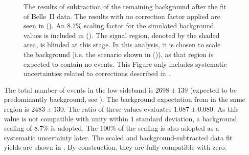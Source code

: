\begin{figure}[hbtp!]
    \centering
    \caption{\label{fig:sidebands_subtracted_figures} The results of subtraction of the remaining \BB background after the fit of Belle~II data.
    The results with no correction factor applied are seen in (). 
    An 8.7\% scaling factor for the simulated background values is included in ().
    The signal region, denoted by the shaded area, is blinded at this stage.
    In this analysis, it is chosen to scale the background (i.e. the scenario shown in ()),
    as that region is expected to contain no \BtoXsgamma events.
    This Figure only includes systematic uncertainties related to corrections described in .
    }
\end{figure}

The total number of events in the low-\EB sideband is $2698\pm139$ (expected to be predominantly background, see ).
The background expectation from \MC in the same region is $2483\pm130$.
The ratio of these values evaluates $1.087\pm0.080$.
As this value is not compatible with unity within $1$ standard deviation, a background scaling of 8.7\% is adopted.
The 100\% of the scaling is also adopted as a systematic uncertainty later.
The scaled and background-subtracted data fit yields are shown in .
By construction, they are fully compatible with zero.

